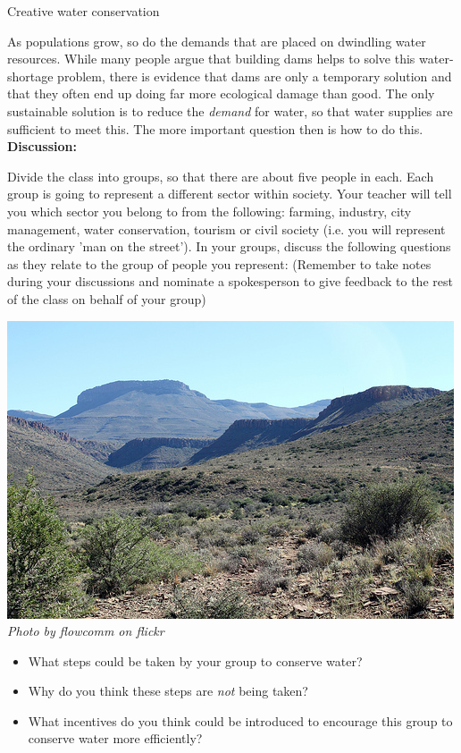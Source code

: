             \begin{groupdiscussion}{ Creative water conservation
}
            \nopagebreak

\label{m38138*uid289435}As populations grow, so do the demands that are placed on dwindling water resources. While many people argue that building dams helps to solve this water-shortage problem, there is evidence that dams are only a temporary solution and that they often end up doing far more ecological damage than good. The only sustainable solution is to reduce the \textsl{demand} for water, so that water supplies are sufficient to meet this. The more important question then is how to do this.\\
\label{m38138*uid5630}\textbf{Discussion:}\\
\begin{minipage}{.6\textwidth}
    Divide the class into groups, so that there are about five people in each. Each group is going to represent a different sector within society. Your teacher will tell you which sector you belong to from the following: farming, industry, city management, water conservation, tourism or civil society (i.e. you will represent the ordinary 'man on the street'). In your groups, discuss the following questions as they relate to the group of people you represent: (Remember to take notes during your discussions and nominate a spokesperson to give feedback to the rest of the class on behalf of your group)
\end{minipage}
\begin{minipage}{.4\textwidth}
 \begin{center}
  \includegraphics[width=.6\textwidth]{photos/karoo_flowcomm.jpg} \\
\textsl{Photo by flowcomm on flickr}
 \end{center}

\end{minipage}
\label{m38138*id342317}\begin{itemize}[noitemsep]
            \label{m38138*uid88}\item What steps could be taken by your group to conserve water?
\label{m38138*uid89}\item Why do you think these steps are \textsl{not} being taken?
\label{m38138*uid90}\item What incentives do you think could be introduced to encourage this group to conserve water more efficiently?
\end{itemize}


\end{groupdiscussion}
